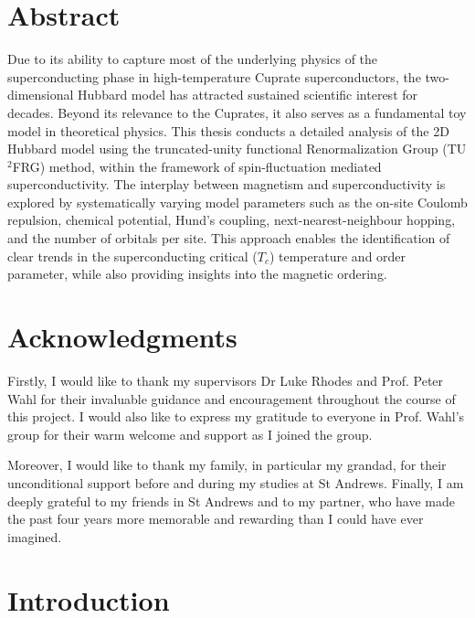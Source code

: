 \documentclass[11pt]{article}
\begin{document}

\tableofcontents 
\newpage 

\section{Abstract}



Due to its ability to capture most of the underlying physics of the superconducting phase in high-temperature Cuprate superconductors\cite{dagotto1994correlated},
the two-dimensional Hubbard model has attracted sustained scientific interest for decades. 
Beyond its relevance to the Cuprates, it also serves as a fundamental toy model in theoretical physics. 
This thesis conducts a detailed analysis of the 2D Hubbard model using the truncated-unity functional Renormalization Group (TU$^2$FRG) method,
within the framework of spin-fluctuation mediated superconductivity.  The interplay between magnetism and superconductivity is explored 
by systematically varying model parameters such as the on-site Coulomb repulsion, chemical potential, Hund's coupling, next-nearest-neighbour hopping, and the number of orbitals per
site. This approach enables the identification of clear trends in the superconducting critical ($T_c$) temperature and order parameter, while also
providing insights into the magnetic ordering.


\section{Acknowledgments}

Firstly, I would like to thank my supervisors Dr Luke Rhodes and Prof. Peter Wahl for their invaluable guidance and encouragement throughout the course of this 
project. I would also like to express my gratitude to everyone in Prof. Wahl's group for their warm welcome 
and support as I joined the group. \par
\medskip
\noindent Moreover, I would like to thank my family, in particular my grandad, for their unconditional support before and during 
my studies at St Andrews. Finally, I am deeply grateful to my friends in St Andrews and to my partner, who have
made the past four years more memorable and rewarding than I could have ever imagined.  


\section{Introduction}
\end{document}
